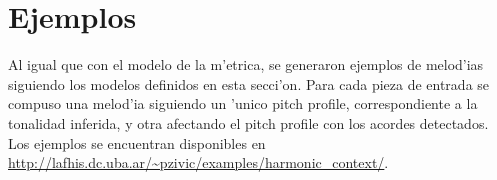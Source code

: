 \section{Ejemplos}
Al igual que con el modelo de la m'etrica, se generaron ejemplos de melod'ias siguiendo los modelos definidos en esta secci'on. Para 
cada pieza de entrada se compuso una melod'ia siguiendo un 'unico pitch profile, correspondiente a la tonalidad inferida, y otra
afectando el pitch profile con los acordes detectados. Los ejemplos se encuentran disponibles en 
\url{http://lafhis.dc.uba.ar/~pzivic/examples/harmonic_context/}.
